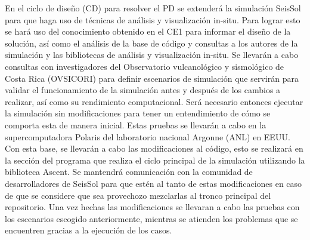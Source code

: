 En el ciclo de diseño (CD) para resolver el PD se extenderá la simulación SeisSol para que haga uso de técnicas de análisis y visualización in-situ. Para lograr esto se hará uso del conocimiento obtenido en el CE1 para informar el diseño de la solución, así como el análisis de la base de código y consultas a los autores de la simulación y las bibliotecas de análisis y visualización in-situ. 
Se llevarán a cabo consultas con investigadores del Observatorio vulcanológico y sismológico de Costa Rica (OVSICORI) para definir escenarios de simulación que servirán para validar el funcionamiento de la simulación antes y después de los cambios a realizar, así como su rendimiento computacional. Será necesario entonces ejecutar la simulación sin modificaciones para tener un entendimiento de cómo se comporta esta de manera inicial. Estas pruebas se llevarán a cabo en la supercomputadora Polaris del laboratorio nacional Argonne (ANL) en EEUU. Con esta base, se llevarán a cabo las modificaciones al código, esto se realizará en la sección del programa que realiza el ciclo principal de la simulación utilizando la biblioteca Ascent. Se mantendrá comunicación con la comunidad de desarrolladores de SeisSol para que estén al tanto de estas modificaciones en caso de que se considere que sea provechozo mezclarlas al tronco principal del repositorio. Una vez hechas las modificaciones se llevaran a cabo las pruebas con los escenarios escogido anteriormente, mientras se atienden los problemas que se encuentren gracias a la ejecución de los casos.

